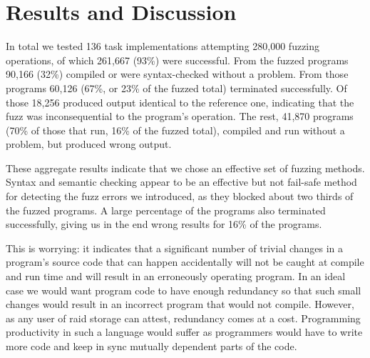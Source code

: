\documentclass[10pt]{sigplanconf}
\begin{document}
\section{Results and Discussion} %
\label{sec:results}

In total we tested
136 task implementations
attempting 280,000 fuzzing operations,
of which 261,667 (93\%) were successful.
From the fuzzed programs 90,166 (32\%)
compiled or were syntax-checked without a problem.
From those programs 60,126 (67\%, or 23\% of the fuzzed total) terminated successfully.
Of those 18,256 produced output identical to the reference one,
indicating that the fuzz was
inconsequential to the program's operation.
The rest, 41,870 programs (70\% of those that run, 16\% of the fuzzed total),
compiled and run without a problem, but produced wrong output.

These aggregate results indicate that we chose an effective set
of fuzzing methods.
Syntax and semantic checking appear to be an effective but not
fail-safe method for detecting the fuzz errors we introduced,
as they blocked about two thirds of the fuzzed programs.
A large percentage of the programs also terminated successfully,
giving us in the end wrong results for 16\% of the programs.

This is worrying:
it indicates that a significant number of trivial changes in a program's source
code that can happen accidentally will not be caught at compile and run
time and will result in an erroneously operating program.
In an ideal case we would want program code to have enough redundancy
so that such small changes would result in an incorrect program
that would not compile.
However, as any user of {\sc raid} storage can attest,
redundancy comes at a cost.
Programming productivity in such a language would suffer as programmers
would have to write more code and keep in sync mutually dependent parts
of the code.
\end{document}
